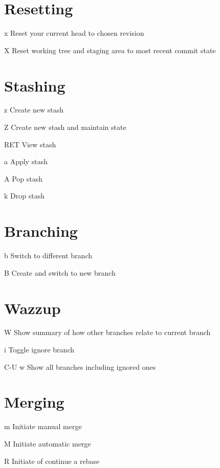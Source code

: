 \documentclass[11pt,a4paper]{article}
\begin{document}
\begin{multicols}{2}
\section{Resetting}
\begin{eqlist}
\item[x] Reset your current head to chosen revision
\item[X] Reset working tree and staging area to most recent commit state
\end{eqlist}

\section{Stashing}
\begin{eqlist}
\item[z] Create new stash
\item[Z] Create new stash and maintain state
\item[RET] View stash
\item[a] Apply stash
\item[A] Pop stash
\item[k] Drop stash
\end{eqlist}

\section{Branching}
\begin{eqlist}
\item[b] Switch to different branch
\item[B] Create and switch to new branch
\end{eqlist}

\section{Wazzup}
\begin{eqlist}
\item[W] Show summary of how other branches relate to current branch
\item[i] Toggle ignore branch
\item[C-U w] Show all branches including ignored ones
\end{eqlist}

\section{Merging}
\begin{eqlist}
\item[m] Initiate manual merge
\item[M] Initiate automatic merge
\item[R] Initiate of continue a rebase
\end{eqlist}


\end{multicols}
\end{document}
